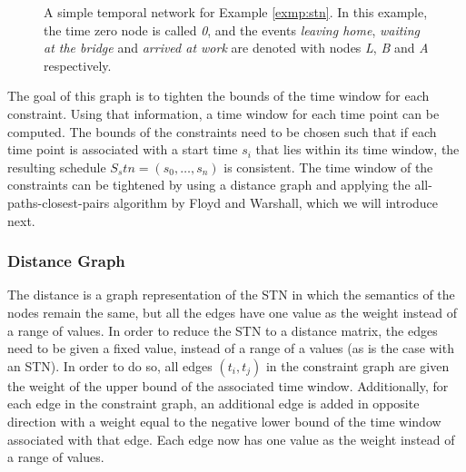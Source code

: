 \documentclass{article}
\theoremstyle{definition}
\begin{document}
\begin{figure}[h]
	\label{fig:stn_example}
	\centering
	\caption{A simple temporal network for Example \ref{exmp:stn}. In this example, the time zero node is called \emph{0}, and the events \emph{leaving home},  \emph{waiting at the bridge} and \emph{arrived at work} are denoted with nodes \emph{L}, \emph{B} and \emph{A} respectively.}
\end{figure}

The goal of this graph is to tighten the bounds of the time window for each constraint. Using that information, a time window for each time point can be computed. The bounds of the constraints need to be chosen such that if each time point is associated with a start time $s_i$ that lies within its time window, the resulting schedule $S_stn = (s_0,\dots, s_n)$ is consistent.
The time window of the constraints can be tightened by using a distance graph and applying the all-paths-closest-pairs algorithm by Floyd and Warshall, which we will introduce next.

\subsubsection{Distance Graph}
\label{text:distance_graph}
The distance is a graph representation of the STN in which the semantics of the nodes remain the same, but all the edges have one value as the weight instead of a range of values.
In order to reduce the STN to a distance matrix, the edges need to be given a fixed value, instead of a range of a values (as is the case with an STN). 
In order to do so, all edges $(t_i, t_j)$ in the constraint graph are given the weight of the upper bound of the associated time window. 
Additionally, for each edge in the constraint graph, an additional edge is added in opposite direction with a weight equal to the negative lower bound of the time window associated with that edge. 
Each edge now has one value as the weight instead of a range of values. 
\end{document}
